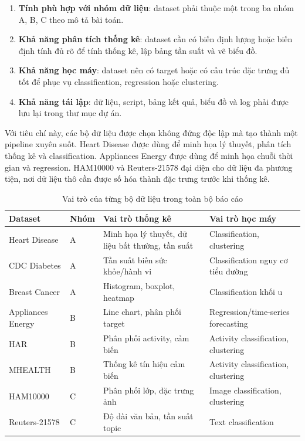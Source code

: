 \begin{enumerate}
 \item \textbf{Tính phù hợp với nhóm dữ liệu}: dataset phải thuộc một trong ba nhóm A, B, C theo mô tả bài toán.
 \item \textbf{Khả năng phân tích thống kê}: dataset cần có biến định lượng hoặc biến định tính đủ rõ để tính thống kê, lập bảng tần suất và vẽ biểu đồ.
 \item \textbf{Khả năng học máy}: dataset nên có target hoặc có cấu trúc đặc trưng đủ tốt để phục vụ classification, regression hoặc clustering.
 \item \textbf{Khả năng tái lập}: dữ liệu, script, bảng kết quả, biểu đồ và log phải được lưu lại trong thư mục dự án.
\end{enumerate}

Với tiêu chí này, các bộ dữ liệu được chọn không đứng độc lập mà tạo thành một pipeline xuyên suốt. Heart Disease được dùng để minh họa lý thuyết, phân tích thống kê và classification. Appliances Energy được dùng để minh họa chuỗi thời gian và regression. HAM10000 và Reuters-21578 đại diện cho dữ liệu đa phương tiện, nơi dữ liệu thô cần được số hóa thành đặc trưng trước khi thống kê.

\begin{table}[H]
\centering
\caption{Vai trò của từng bộ dữ liệu trong toàn bộ báo cáo}
\label{tab:chapter2_dataset_role_matrix}
\small
\begin{tabular}{p{}p{}p{}p{}}
\toprule
Dataset & Nhóm & Vai trò thống kê & Vai trò học máy \\
\midrule
Heart Disease & A & Minh họa lý thuyết, dữ liệu bất thường, tần suất & Classification, clustering \\
CDC Diabetes & A & Tần suất biến sức khỏe/hành vi & Classification nguy cơ tiểu đường \\
Breast Cancer & A & Histogram, boxplot, heatmap & Classification khối u \\
Appliances Energy & B & Line chart, phân phối target & Regression/time-series forecasting \\
HAR & B & Phân phối activity, cảm biến & Activity classification, clustering \\
MHEALTH & B & Thống kê tín hiệu cảm biến & Activity classification, clustering \\
HAM10000 & C & Phân phối lớp, đặc trưng ảnh & Image classification, clustering \\
Reuters-21578 & C & Độ dài văn bản, tần suất topic & Text classification \\
\bottomrule
\end{tabular}
\end{table}

